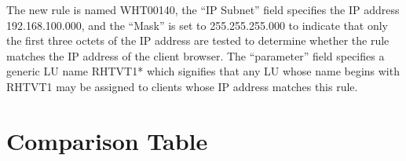 \documentclass[letterpaper,10pt,english]{sphinxmanual}
\begin{document}
\begin{sphinxVerbatim}[commandchars=\\\{\}]
          
   
         
            
       
\end{sphinxVerbatim}


The new rule is named WHT00140, the “IP Subnet” field specifies the IP address 192.168.100.000, and the “Mask” is set to 255.255.255.000 to indicate that only the first three octets of the IP address are tested to determine whether the rule matches the IP address of the client browser. The “parameter” field specifies a generic LU name RHTVT1* which signifies that any LU whose name begins with RHTVT1 may be assigned to clients whose IP address matches this rule.

\newpage


\section{Comparison Table}
\label{\detokenize{connectivity_guide:comparison-table}}\label{\detokenize{connectivity_guide:index-155}}
\end{document}
